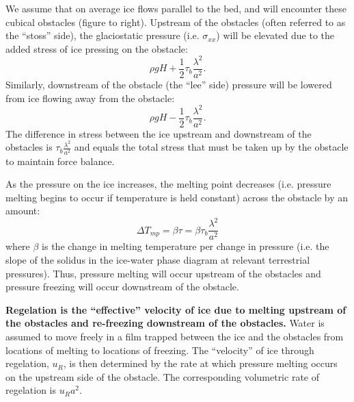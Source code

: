 \documentclass[12pt]{article}
\theoremstyle{definition}
\begin{document}
We assume that on average ice flows parallel to the bed, and will encounter these cubical obstacles (figure to right). Upstream of the obstacles (often referred to as the ``stoss'' side), the glaciostatic pressure (i.e. $\sigma_{xx}$) will be elevated due to the added stress of ice pressing on the obstacle: 
\begin{equation}
\rho g H + \frac{1}{2} \tau_b \frac{\lambda^2}{a^2} .
\end{equation}
Similarly, downstream of the obstacle (the ``lee'' side) pressure will be lowered from ice flowing away from the obstacle:
\begin{equation}
\rho g H - \frac{1}{2} \tau_b \frac{\lambda^2}{a^2}.
\end{equation}
The difference in stress between the ice upstream and downstream of the obstacles is $\tau_b \frac{\lambda^2}{a^2}$ and equals the total stress that must be taken up by the obstacle to maintain force balance.

As the pressure on the ice increases, the melting point decreases (i.e. pressure melting begins to occur if temperature is held constant) across the obstacle by an amount:
\begin{equation}
\label{eq:delT}
\Delta T_{mp} = \beta \tau = \beta \tau_b \frac{\lambda^2}{a^2}
\end{equation}
where $\beta$ is the change in melting temperature per change in pressure (i.e. the slope of the solidus in the ice-water phase diagram at relevant terrestrial pressures). Thus, pressure melting will occur upstream of the obstacles and pressure freezing will occur downstream of the obstacle.

\textbf{Regelation is the ``effective'' velocity of ice due to melting upstream of the obstacles and re-freezing downstream of the obstacles.} Water is assumed to move freely in a film trapped between the ice and the obstacles from locations of melting to locations of freezing. The ``velocity'' of ice through regelation, $u_R$, is then determined by the rate at which pressure melting occurs on the upstream side of the obstacle. The corresponding volumetric rate of regelation is $u_R a^2$. \\
\end{document}
